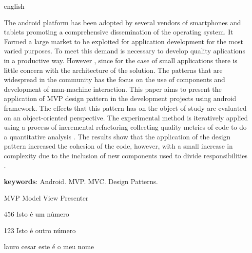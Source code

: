 \documentclass[
	12pt,				%
	openright,			%
	twoside,			%
	a4paper,			%
	english,			%
	french,				%
	spanish,			%
	brazil,				%
	]{abntex2}
\begin{document}
\begin{resumo}[Abstract]
 \begin{otherlanguage*}{english}

The android platform has been adopted by several vendors of smartphones and
tablets promoting a comprehensive dissemination of the operating system.
It Formed a large market to be exploited for application development
for the most varied purposes. To meet this demand is necessary to develop
quality aplications in a productive way. However , since for the case
of small applications there is little concern with the architecture of the solution.
The patterns that are widespread in the community has the focus on the use of
components and development of man-machine interaction. This paper aims to present the
application of MVP design pattern in the development projects using android
framework. The effects that this pattern has on the object of study are
evaluated on an object-oriented perspective. The experimental method is
iteratively applied using a  process of incremental refactoring collecting
quality metrics of code to do a quantitative analysis .
The results show that the application of the design pattern increased the
cohesion of the code, however, with a small increase in complexity due to the inclusion of new
components used to divide responsibilities .

 \vspace{\onelineskip}
    
 \noindent
 \textbf{keywords}: Android. MVP. MVC. Design Patterns.
 \end{otherlanguage*}
\end{resumo}


\listoffigures*
\cleardoublepage

\listoftables*
\cleardoublepage

\begin{siglas}
  \item[MVP] Model View Presenter
  \item[456] Isto é um número
  \item[123] Isto é outro número
  \item[lauro cesar] este é o meu nome
\end{siglas}


\tableofcontents*
\cleardoublepage
\end{document}
